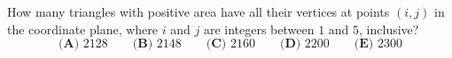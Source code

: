 How many triangles with positive area have all their vertices at points $(i,j)$ in the coordinate plane, where $i$ and $j$ are integers between $1$ and $5$, inclusive?
\[
\textbf{(A) }2128\qquad\textbf{(B) }2148\qquad\textbf{(C) }2160\qquad\textbf{(D) }2200\qquad\textbf{(E) }2300
\]

